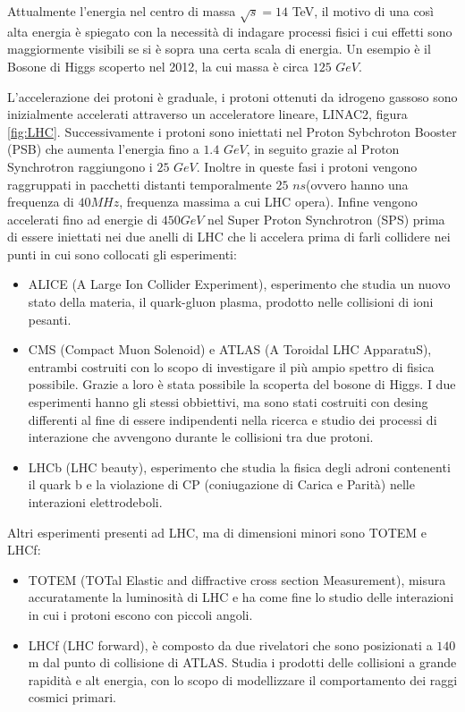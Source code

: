 Attualmente l'energia nel centro di massa $\sqrt{s}=14$ TeV, il motivo di una così alta energia è spiegato con la necessità di indagare processi fisici i cui effetti sono maggiormente visibili se si è sopra una certa scala di energia. Un esempio è il Bosone di Higgs scoperto nel 2012, la cui massa è circa $125$ $GeV$.

L'accelerazione dei protoni è graduale, i protoni ottenuti da idrogeno gassoso sono inizialmente accelerati attraverso un acceleratore lineare, LINAC2, figura \ref{fig:LHC}. Successivamente i protoni sono iniettati nel Proton Sybchroton Booster (PSB) che aumenta l'energia fino a $1.4$ $GeV$, in seguito grazie al Proton Synchrotron raggiungono i $25$ $GeV$. 
Inoltre in queste fasi i protoni vengono raggruppati in pacchetti distanti temporalmente $25$ $ns$(ovvero hanno una frequenza di $40 MHz$, frequenza massima a cui LHC opera). 
Infine vengono accelerati fino ad energie di $450 GeV$ nel Super Proton Synchrotron (SPS) prima di essere iniettati nei due anelli di LHC che li accelera prima di farli collidere nei punti in cui sono collocati gli esperimenti:

\begin{itemize}
\item ALICE (A Large Ion Collider Experiment), esperimento che studia un nuovo stato della materia, il quark-gluon plasma, prodotto nelle collisioni di ioni pesanti.

\item CMS (Compact Muon Solenoid) e ATLAS (A Toroidal LHC ApparatuS), entrambi costruiti con lo scopo di investigare il più ampio spettro di fisica possibile. Grazie a loro è stata possibile la scoperta del bosone di Higgs. I due esperimenti hanno gli stessi obbiettivi, ma sono stati costruiti con desing differenti al fine di essere indipendenti nella ricerca e studio dei processi di interazione che avvengono durante le collisioni tra due protoni.

\item LHCb (LHC beauty), esperimento che studia la fisica degli adroni contenenti il quark b e la violazione di CP (coniugazione di Carica e Parità) nelle interazioni elettrodeboli.
\end{itemize}
Altri esperimenti presenti ad LHC, ma di dimensioni minori sono TOTEM e LHCf:

\begin{itemize}
\item TOTEM (TOTal Elastic and diffractive cross section Measurement), misura accuratamente la luminosità di LHC e ha come fine lo studio delle interazioni in cui i protoni escono con piccoli angoli.

\item LHCf (LHC forward), è composto da due rivelatori che sono posizionati a $140$ m dal punto di collisione di ATLAS. Studia i prodotti delle collisioni a grande rapidità e alt energia, con lo scopo di modellizzare il comportamento dei raggi cosmici primari.
\end{itemize}



